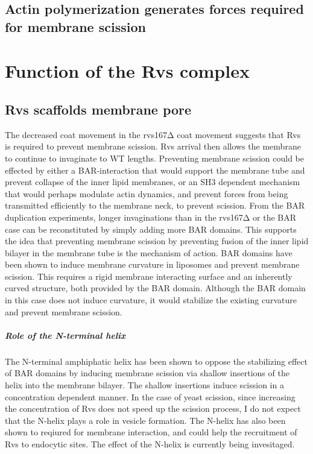 \subsection{ Actin polymerization generates forces required for membrane scission}

\section{Function of the Rvs complex}

\subsection{Rvs scaffolds membrane pore}
The decreased coat movement in the rvs167Δ coat movement suggests that Rvs is required to prevent membrane scission. Rvs arrival then allows the membrane to continue to invaginate to WT lengths. Preventing membrane scission could be effected by either a BAR-interaction that would support the membrane tube and prevent collapse of the inner lipid membranes, or an SH3 dependent mechanism that would perhaps modulate actin dynamics, and prevent forces from being transmitted efficiently to the membrane neck, to prevent scission. From the BAR duplication experiments, longer invaginations than in the rvs167Δ or the BAR case can be reconstituted by simply adding more BAR domains. This supports the idea that preventing membrane scission by preventing fusion of the inner lipid bilayer in the membrane tube is the mechanism of action. 
BAR domains have been shown to induce membrane curvature in liposomes and prevent membrane scission. This requires a rigid membrane interacting surface and an inherently curved structure, both provided by the BAR domain. Although the BAR domain in this case does not induce curvature, it would stabilize the existing curvature and prevent membrane scission. 
\subparagraph{Role of the N-terminal helix}
The N-terminal amphiphatic helix has been shown to oppose the stabilizing effect of BAR domains by inducing membrane scission via shallow insertions of the helix into the membrane bilayer. The shallow insertions induce scission in a concentration dependent manner. In the case of yeast scission, since increasing the concentration of Rvs does not speed up the scission process, I do not expect that the N-helix plays a role in vesicle formation. The N-helix has also been shown to reqiured for membrane interaction, and could help the recruitment of Rvs to endocytic sites. The effect of the N-helix is currently being invesitaged.

